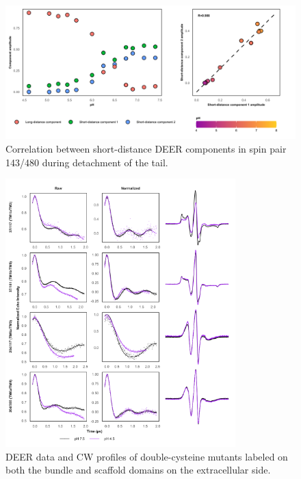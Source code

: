 \begin{figure}[h]
\centering
\includegraphics[width=6.5in]{Figures/gadc_supp_tail_rsq.png}
\caption[Correlation between short-distance DEER components in spin pair 143/480 during detachment of the tail.]{Correlation between short-distance DEER components in spin pair 143/480 during detachment of the tail.}
\label{fig:gadc_supp_tail_rsq}
\end{figure}

\begin{figure}[h]
\centering
\includegraphics[width=3.5in]{Figures/gadc_supp_bundle_hash_extra.pdf}
\caption[DEER data and CW profiles of double-cysteine mutants labeled on both the bundle and scaffold domains on the extracellular side.]{DEER data and CW profiles of double-cysteine mutants labeled on both the bundle and scaffold domains on the extracellular side.}
\label{fig:gadc_supp_bundle_hash_extra}
\end{figure}

